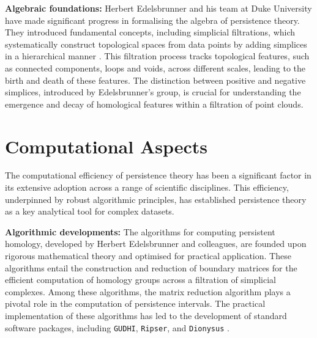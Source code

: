 \textbf{Algebraic foundations:} Herbert Edelsbrunner and his team at Duke University have made significant progress in formalising the algebra of persistence theory. They introduced fundamental concepts, including simplicial filtrations, which systematically construct topological spaces from data points by adding simplices in a hierarchical manner \cite{Edelsbrunner2000}. This filtration process tracks topological features, such as connected components, loops and voids, across different scales, leading to the birth and death of these features. The distinction between positive and negative simplices, introduced by Edelsbrunner's group, is crucial for understanding the emergence and decay of homological features within a filtration of point clouds. 

\section{Computational Aspects}
The computational efficiency of persistence theory has been a significant factor in its extensive adoption across a range of scientific disciplines. This efficiency, underpinned by robust algorithmic principles, has established persistence theory as a key analytical tool for complex datasets.

\textbf{Algorithmic developments:} The algorithms for computing persistent homology, developed by Herbert Edelsbrunner and colleagues, are founded upon rigorous mathematical theory and optimised for practical application. These algorithms entail the construction and reduction of boundary matrices for the efficient computation of homology groups across a filtration of simplicial complexes. Among these algorithms, the matrix reduction algorithm plays a pivotal role in the computation of persistence intervals. The practical implementation of these algorithms has led to the development of standard software packages, including \texttt{GUDHI}, \texttt{Ripser}, and \texttt{Dionysus} \cite{Otter2017}.

